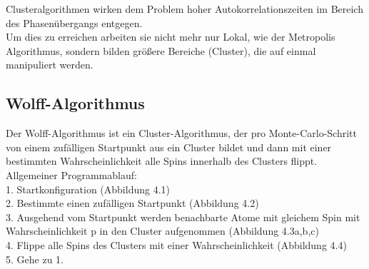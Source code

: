 Clusteralgorithmen wirken dem Problem hoher Autokorrelationszeiten im Bereich des Phasenübergangs entgegen.\\
Um dies zu erreichen arbeiten sie nicht mehr nur Lokal, wie der Metropolis Algorithmus, sondern bilden größere Bereiche (Cluster), die auf einmal manipuliert werden.

\subsection{Wolff-Algorithmus}
Der Wolff-Algorithmus ist ein Cluster-Algorithmus, der pro Monte-Carlo-Schritt von einem zufälligen Startpunkt aus ein Cluster bildet und dann mit einer bestimmten Wahrscheinlichkeit alle Spins innerhalb des Clusters flippt.\\
Allgemeiner Programmablauf:\\
1. Startkonfiguration (Abbildung 4.1)\\
2. Bestimmte einen zufälligen Startpunkt (Abbildung 4.2)\\
3. Ausgehend vom Startpunkt werden benachbarte Atome mit gleichem Spin mit Wahrscheinlichkeit p in den Cluster aufgenommen (Abbildung 4.3a,b,c)\\
4. Flippe alle Spins des Clusters mit einer Wahrscheinlichkeit (Abbildung 4.4)\\
5. Gehe zu 1.\\
